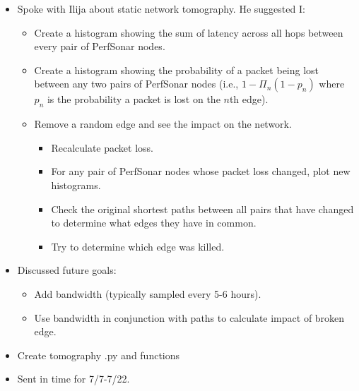 \documentclass{weeklyreport}
\begin{document}
\begin{itemize}
    \item Spoke with Ilija about static network tomography. He suggested I:
    \begin{itemize}
    	\item Create a histogram showing the sum of latency across all hops between every pair of PerfSonar nodes.
    	\item Create a histogram showing the probability of a packet being lost between any two pairs of PerfSonar nodes (i.e., $1-\Pi_n (1-p_n)$ where $p_n$ is the probability a packet is lost on the $n$th edge).
    	\item Remove a random edge and see the impact on the network.
    	\begin{itemize}
    		\item Recalculate packet loss. 
    		\item For any pair of PerfSonar nodes whose packet loss changed, plot new histograms. 
    		\item Check the original shortest paths between all pairs that have changed to determine what edges they have in common.
    		\item Try to determine which edge was killed.
    	\end{itemize}
    \end{itemize}
    \item Discussed future goals:
    \begin{itemize}
    	\item Add bandwidth (typically sampled every 5-6 hours).
    	\item Use bandwidth in conjunction with paths to calculate impact of broken edge.
    \end{itemize}
    \item Create tomography .py and functions
    \item Sent in time for 7/7-7/22.
\end{itemize}

\subsection*{}
\end{document}

